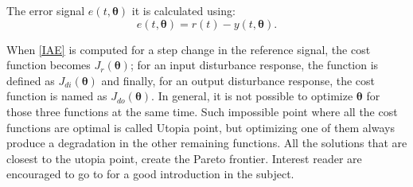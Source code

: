 The error signal $e(t, \bm{\theta})$ it is calculated using:
%
\begin{equation}  %
e(t,\bm{\theta})=r(t)-y(t,\bm{\theta}).
\label{error}
\end{equation}

When \eqref{IAE} is computed for a step change in the reference signal, the cost function becomes $J_r(\bm{\theta})$; for an input disturbance response, the function is defined as $J_{di}(\bm{\theta})$ and finally, for an output disturbance response, the cost function is named as $J_{do}(\bm{\theta})$. In general, it is not possible to optimize $\bm{\theta}$ for those three functions at the same time. Such impossible point where all the cost functions are optimal is called Utopia point, but optimizing one of them always produce a degradation in the other remaining functions. All the solutions that are closest to the utopia point, create the Pareto frontier. %
Interest reader are encouraged to go to \textcite{Marler2004} for a good introduction in the subject.

%

